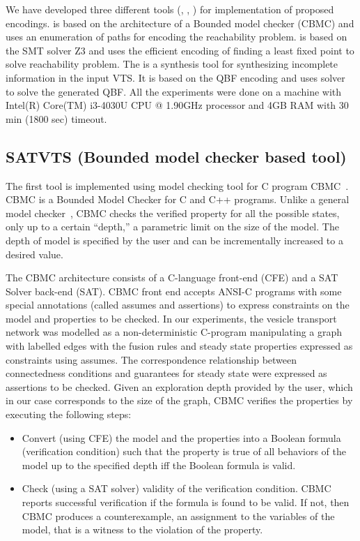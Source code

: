 %

We have developed three different tools (\sattool, \smttool, \ourtool) for implementation of proposed encodings. {\sattool} is based on the architecture of a Bounded model checker (CBMC) and uses an enumeration of paths for encoding the reachability problem. {\smttool} is based on the SMT solver Z3 and uses the efficient encoding of finding a least fixed point to solve reachability problem. The {\ourtool} is a synthesis tool for synthesizing incomplete information in the input VTS. It is based on the QBF encoding and uses {\depqbf} solver to solve the generated QBF. All the experiments were done on a machine with Intel(R) Core(TM) i3-4030U CPU @ 1.90GHz processor and 4GB RAM with 30 min (1800 sec) timeout.

%

%

\subsection{SATVTS (Bounded model checker based tool)} 
The first tool is implemented using model checking tool for C program CBMC~\cite{clarke2004tool}.
%
CBMC is a Bounded Model Checker for C and C++ programs. 
%
Unlike a general model checker~\cite{cimatti2002nusmv}, CBMC checks the verified property for all the possible states, only up to a certain “depth,” a parametric limit on the size of the model.
%
The depth of model is specified by the user and can be  incrementally increased to a desired value.

The CBMC architecture consists of a C-language front-end (CFE) and a SAT Solver back-end (SAT). 
%
CBMC front end accepts ANSI-C programs with some special annotations (called assumes and assertions) to express constraints on the model and properties to be checked. 
%		
In our experiments, the vesicle transport network was modelled as a non-deterministic C-program manipulating a graph with labelled edges with the fusion rules and steady state properties expressed as constraints using assumes. 
%		
The correspondence relationship between connectedness conditions
and guarantees for steady state were expressed as assertions to be checked. 
%		
Given an exploration depth provided by the user, which in our case corresponds to the size of the graph, CBMC verifies the properties by executing the following steps:
	\begin{itemize}
	\item Convert (using CFE) the model and the properties into a Boolean formula (verification condition) such that the property is true of all behaviors of the model up to the specified
depth iff the Boolean formula is valid.
	\item Check (using a SAT solver) validity of the verification condition. CBMC reports successful verification if the formula is found to be valid. If not, then CBMC produces a counterexample,
an assignment to the variables of the model, that is a witness to the violation of the property.
	\end{itemize}

